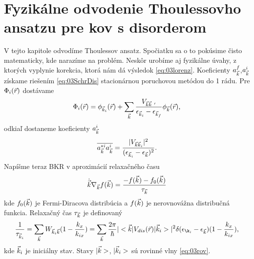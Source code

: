 \section{Fyzikálne odvodenie Thoulessovho ansatzu pre kov s disorderom}
\label{sec:thouless}
V tejto kapitole odvodíme Thoulessov ansatz. Spočiatku sa o to pokúsime čisto matematicky, kde narazíme na problém. Neskôr urobíme aj fyzikálne úvahy, z ktorých vyplynie korekcia, ktorá nám dá výsledok \eqref{eq:03lorenz}. 
Koeficienty $a^f_{\vec{k}}$,$a^i_{\vec{k}}$ získame riešením \eqref{eq:03SchrDis} stacionárnou poruchovou metódou do 1 rádu. Pre $\Phi_i(\vec{r})$ dostávame
\begin{align}
\Phi_i(\vr)=\phi_{\vk_i}(\vr)+\sum_{\vk}\frac{V_{\vk\vk\ '}}{\epsilon_{\vk_i}-\epsilon_{\vk_f}}\phi_{\vk}(\vr)\text{,}
\end{align}
odkiaľ dostaneme koeficienty $a^i_{\vec{k}}$
\begin{align}
\label{eq:04coef}
\overline{a^{*i}_{\vec{k}}a^i_{\vec{k}}}=\frac{|V_{\vec{k}\vec{k}_i}|^2}{(\epsilon_{\vec{k}_i}-\epsilon_{\vec{k}})^2}\text{.}
\end{align}
Napíšme teraz BKR v aproximácií relaxačného času 
\begin{align}
\dot{\vec{k}}\nabla_{\vec{k}}f(\vec{k})=\frac{-f(\vec{k})-f_0(\vec{k})}{\tau_{\vec{k}}}
\end{align}
kde $f_0(\vec{k})$ je Fermi-Diracova distribúcia a $f(\vec{k})$ je nerovnovážna distribučná funkcia. Relaxačný čas  $\tau_{\vec{k}}$ je definovaný
\begin{align}
\label{eq:04goldenrule}
\frac{1}{\tau_{\vk_i}}=\sum_{\vk}W_{\vk_i\vk}(1-\frac{k_x}{k_{ix}}) = \sum_{\vk}\frac{2\pi}{\hbar}|\bra{\vk}V_{dis}(\vr)\ket{\vk_i}|^2\delta(\epsilon_{\k_i}-\epsilon_{\vk})(1-\frac{k_x}{k_{ix}}) \text{,}
\end{align}
kde $\vec{k}_i$ je iniciálny stav. Stavy $|\vec{k}>$, $|\vec{k}_i>$ sú rovinné vlny \eqref{eq:03rov}.

